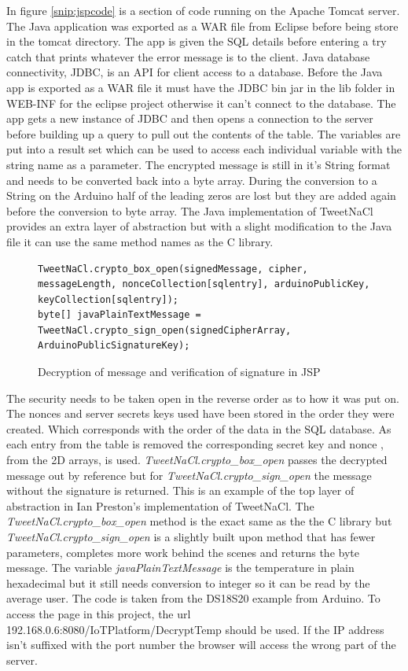 In figure \ref{snip:jspcode} is a section of code running on the Apache Tomcat server. The Java application was exported as a WAR file from Eclipse before being store in the tomcat directory. The app is given the SQL details before entering a try catch that prints whatever the error message is to the client. Java database connectivity, JDBC, is an API for client access to a database. Before the Java app is exported as a WAR file it must have the JDBC bin jar in the lib folder in WEB-INF for the eclipse project otherwise it can't connect to the database\cite{jdbc}. The app gets a new instance of JDBC and then opens a connection to the server before building up a query to pull out the contents of the table. The variables are put into a result set which can be used to access each individual variable with the string name as a parameter. The encrypted message is still in it's String format and needs to be converted back into a byte array. During the conversion to a String on the Arduino half of the leading zeros are lost but they are added again before the conversion to byte array. The Java implementation of TweetNaCl provides an extra layer of abstraction but with a slight modification to the Java file it can use the same method names as the C library.

\begin{figure}[H]
\begin{lstlisting}[style=Java]
TweetNaCl.crypto_box_open(signedMessage, cipher, messageLength, nonceCollection[sqlentry], arduinoPublicKey, keyCollection[sqlentry]);
byte[] javaPlainTextMessage = TweetNaCl.crypto_sign_open(signedCipherArray, ArduinoPublicSignatureKey);
\end{lstlisting}
\caption{Decryption of message and verification of signature in JSP}
\label{snip:decryptjsp}
\end{figure}

The security needs to be taken open in the reverse order as to how it was put on. The nonces and server secrets keys used have been stored in the order they were created. Which corresponds with the order of the data in the SQL database. As each entry from the table is removed the corresponding secret key and nonce , from the 2D arrays, is used. \emph{TweetNaCl.crypto\_box\_open} passes the decrypted message out by reference but for \emph{TweetNaCl.crypto\_sign\_open} the message without the signature is returned. This is an example of the top layer of abstraction in Ian Preston's implementation of TweetNaCl. The  \emph{TweetNaCl.crypto\_box\_open} method is the exact same as the the C library but \emph{TweetNaCl.crypto\_sign\_open} is a slightly built upon method that has fewer parameters, completes more work behind the scenes and returns the byte message. The variable \emph{javaPlainTextMessage} is the temperature in plain hexadecimal but it still needs conversion to integer so it can be read by the average user. The code is taken from the DS18S20 example from Arduino. To access the page in this project, the url 192.168.0.6:8080/IoTPlatform/DecryptTemp should be used. If the IP address isn't suffixed with the port number the browser will access the wrong part of the server.

